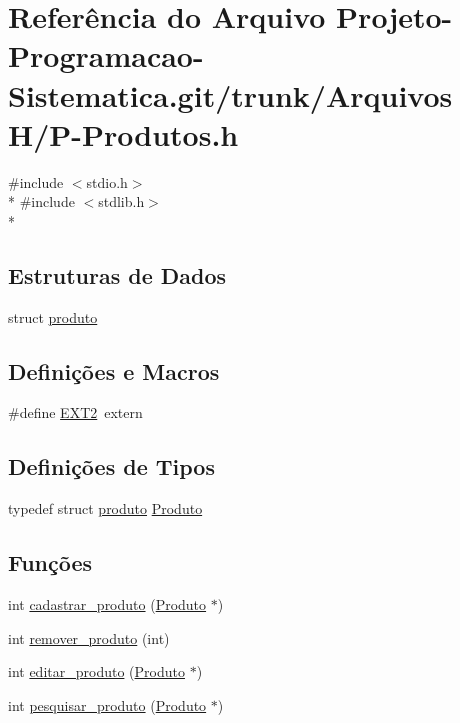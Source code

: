\hypertarget{_p-_produtos_8h}{\section{Referência do Arquivo Projeto-\/\-Programacao-\/\-Sistematica.git/trunk/\-Arquivos H/\-P-\/\-Produtos.h}
\label{_p-_produtos_8h}
}
{\ttfamily \#include $<$stdio.\-h$>$}\\*
{\ttfamily \#include $<$stdlib.\-h$>$}\\*
\subsection*{Estruturas de Dados}
\begin{DoxyCompactItemize}
\item 
struct \hyperlink{structproduto}{produto}
\end{DoxyCompactItemize}
\subsection*{Definições e Macros}
\begin{DoxyCompactItemize}
\item 
\#define \hyperlink{_p-_produtos_8h_ad7b65f22fe3a91d067e8ed32676ef2f5}{E\-X\-T2}~extern
\end{DoxyCompactItemize}
\subsection*{Definições de Tipos}
\begin{DoxyCompactItemize}
\item 
typedef struct \hyperlink{structproduto}{produto} \hyperlink{_p-_produtos_8h_aab5e6b4227111edb38705df89c619b76}{Produto}
\end{DoxyCompactItemize}
\subsection*{Funções}
\begin{DoxyCompactItemize}
\item 
int \hyperlink{_p-_produtos_8h_a0d7a8d652315249c126d88e0ab11b410}{cadastrar\-\_\-produto} (\hyperlink{_p-_produtos_8h_aab5e6b4227111edb38705df89c619b76}{Produto} $\ast$)
\item 
int \hyperlink{_p-_produtos_8h_ae3644b95b2a6e9c24f34f73964c14923}{remover\-\_\-produto} (int)
\item 
int \hyperlink{_p-_produtos_8h_a150b90fb78f61d62565cf3923d3d54be}{editar\-\_\-produto} (\hyperlink{_p-_produtos_8h_aab5e6b4227111edb38705df89c619b76}{Produto} $\ast$)
\item 
int \hyperlink{_p-_produtos_8h_a35bfcb635db1bb6de791997e438df69f}{pesquisar\-\_\-produto} (\hyperlink{_p-_produtos_8h_aab5e6b4227111edb38705df89c619b76}{Produto} $\ast$)
\end{DoxyCompactItemize}


